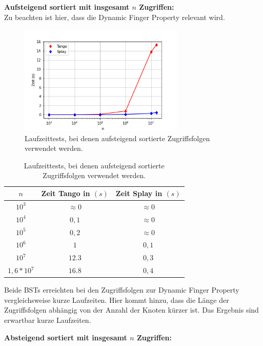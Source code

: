\documentclass[a4paper,12pt]{article}
\begin{document}
 \bigskip

\noindent \textbf{Aufsteigend sortiert mit insgesamt $n$ Zugriffen:}\\
\bigskip
Zu beachten ist hier, dass die Dynamic Finger Property relevant wird. 

\begin{figure}[H]
	\centering
	\includegraphics[width=0.7\textwidth]{Medien/laufzeittest/diagramm/sorted1}
	\caption{Laufzeittests, bei denen aufsteigend sortierte Zugriffsfolgen verwendet werden.}
\end{figure}
\begin{table}[H]
	\begin{center}
		\begin{tabular}[c]{|c|c|c|}
			\hline
			$n$ & Zeit Tango in $\left(s\right)$ &Zeit Splay in $\left(s\right)$ \\
			\hline
			$10^3$ & $\approx 0$ &$\approx 0$ \\
			\hline
			$10^4$  & $0,1$ &$\approx 0$  \\
			\hline
			$10^5$  & $0,2$ &$\approx 0$  \\
			\hline
			$10^6$  & $1$ &$0,1$  \\
			\hline
			$10^7$  & $12.3$ &$0,3$  \\
			\hline
			$1,6 *10^7$  & $16.8$ &$0,4$  \\
			\hline
		\end{tabular}
		\caption{Laufzeittests, bei denen aufsteigend sortierte Zugriffsfolgen verwendet werden.} 
	\end{center}
\end{table}
\noindent Beide BSTs erreichten bei den Zugriffsfolgen zur Dynamic Finger Property  vergleichsweise kurze Laufzeiten. Hier kommt hinzu, dass die Länge der Zugriffsfolgen abhängig von der Anzahl der Knoten kürzer ist. Das Ergebnis sind erwartbar kurze Laufzeiten.
\newpage

\bigskip
\noindent \textbf{Absteigend sortiert mit insgesamt $n$ Zugriffen:\\}
\end{document}
